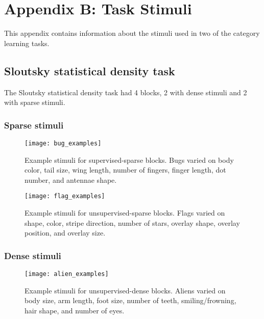 \documentclass[../dissertation.tex]{subfiles}
\begin{document}
\section{Appendix B: Task Stimuli} \label{appendixB}

This appendix contains information about the stimuli used in two of the category learning tasks.

\subsection{Sloutsky statistical density task}

The Sloutsky statistical density task had 4 blocks, 2 with dense stimuli and 2 with sparse stimuli.

\subsubsection{Sparse stimuli}

\begin{figure}[H]
\begin{center}
\texttt{[image: bug\_examples]}
\caption[Example stimuli for supervised-sparse blocks]{Example stimuli for supervised-sparse blocks. Bugs varied on body color, tail size, wing length, number of fingers, finger length, dot number, and antennae shape.}
\vspace{-10pt}
\label{bugs}
\end{center}
\end{figure}

\begin{figure}[H]
\begin{center}
\texttt{[image: flag\_examples]}
\caption[Example stimuli for unsupervised-sparse blocks]{Example stimuli for unsupervised-sparse blocks. Flags varied on shape, color, stripe direction, number of stars, overlay shape, overlay position, and overlay size.}
\vspace{-10pt}
\label{flags}
\end{center}
\end{figure}

\subsubsection{Dense stimuli}

\begin{figure}[H]
\begin{center}
\texttt{[image: alien\_examples]}
\caption[Example stimuli for unsupervised-dense blocks]{Example stimuli for unsupervised-dense blocks. Aliens varied on body size, arm length, foot size, number of teeth, smiling/frowning, hair shape, and number of eyes.}
\vspace{-10pt}
\label{aliens}
\end{center}
\end{figure}
\end{document}
